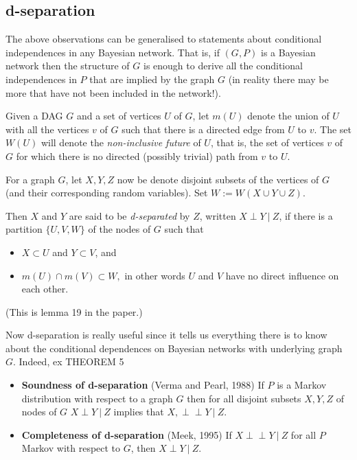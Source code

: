 \documentclass[11pt, oneside]{article}   	%
\def\ci{\perp\!\!\!\perp}
\begin{document}
\subsection{d-separation}

The above observations can be generalised to statements about conditional independences in any Bayesian network. That is, if $(G,P)$ is a Bayesian network then the structure of $G$ is enough to derive all the conditional independences in $P$ that are implied by the graph $G$ (in reality there may be more that have not been included in the network!).

Given a DAG $G$ and a set of vertices $U$ of $G$, let $m(U)$ denote the union of $U$ with all the vertices $v$ of $G$ such that there is a directed edge from $U$ to $v$. The set $W(U)$ will denote the \emph{non-inclusive future} of $U$, that is, the set of vertices $v$ of $G$ for which there is no directed (possibly trivial) path from $v$ to $U$. 

For a graph $G$,  let $X, Y, Z$ now be denote disjoint subsets of the vertices of $G$ (and their corresponding random variables). Set $W := W(X \cup Y \cup Z)$.%

Then $X$ and $Y$ are said to be \emph{d-separated} by $Z$, written $X \perp Y   \ | \ Z$, if there is a partition $\{U,V,W\}$ of the nodes of $ G$ such that 
\begin{itemize}
\item $X \subset U$ and $Y \subset V$, and \item $m(U) \cap m(V) \subset W,$ in other words $U$ and $V$ have no direct influence on each other. \end{itemize} (This is lemma 19 in the paper.)

Now d-separation is really useful since it tells us everything there is to know about the conditional dependences on Bayesian networks with underlying graph $G$. Indeed, 
 ex
THEOREM 5

\begin{itemize} \item \textbf{Soundness of d-separation} (Verma and Pearl, 1988)
If $P$ is a Markov distribution with respect to a graph $G$ then for all disjoint subsets $X,Y,Z$ of nodes of $G$  $X \perp Y   \ | \ Z$ implies that $X,\ci Y   \ | \ Z$.
\item \textbf{Completeness of d-separation} (Meek, 1995)
If $X \ci Y   \ | \ Z$ for all $P$ Markov with respect to $G$, then $ X \perp Y   \ | \ Z$.
\end{itemize}
\end{document}
